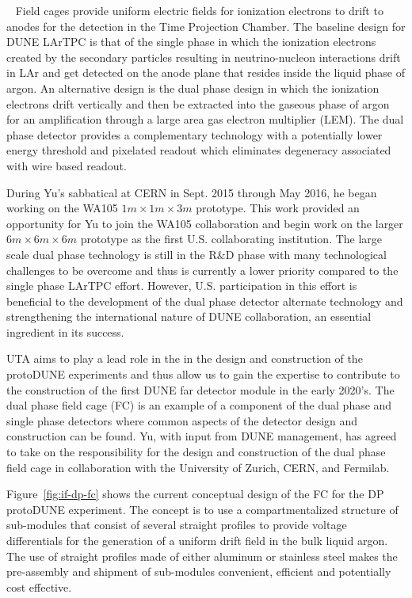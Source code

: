 ~\label{sec:proto-dune-dp-fc}
Field cages provide uniform electric fields for ionization electrons to drift to anodes for the detection in the Time Projection Chamber. The baseline design for DUNE LArTPC is that of the single phase in which the ionization electrons created by the secondary particles resulting in neutrino-nucleon interactions drift in LAr and get detected on the anode plane that resides inside the liquid phase of argon. An alternative design is the dual phase design in which the ionization electrons drift vertically and then be extracted into the gaseous phase of argon for an amplification through a large area gas electron multiplier (LEM). The dual phase detector provides a complementary technology with a potentially lower energy threshold and pixelated readout which eliminates degeneracy associated with wire based readout.

During Yu's sabbatical at CERN in Sept. 2015 through May 2016, he began working on the WA105 $1m\times 1m\times 3m$ prototype. This work provided an opportunity for Yu to join the WA105 collaboration and begin work on the larger $6m\times 6m\times 6m$ prototype as the first U.S. collaborating institution. The large scale dual phase technology is still in the R$\&$D phase with many technological challenges to be overcome and thus is currently a lower priority compared to the single phase LArTPC effort. However, U.S. participation in this effort is beneficial to the development of the dual phase detector alternate technology and strengthening the international nature of DUNE collaboration, an essential ingredient in its success.

UTA aims to play a lead role in the in the design and construction of the protoDUNE experiments and thus allow us to gain the expertise to contribute to the construction of the first DUNE far detector module in the early 2020's. The dual phase field cage (FC) is an example of a component of the dual phase and single phase detectors where common aspects of the detector design and construction can be found. Yu, with input from DUNE management, has agreed to take on the responsibility for the design and construction of the dual phase field cage in collaboration with the University of Zurich, CERN, and Fermilab.


Figure~\ref{fig:if-dp-fc} shows the current conceptual design of the FC for the DP protoDUNE experiment.  The concept is to use a compartmentalized structure of sub-modules that consist of several straight profiles to provide voltage differentials for the generation of a uniform drift field in the bulk liquid argon. The use of straight profiles made of either aluminum or stainless steel makes the pre-assembly and shipment of sub-modules convenient, efficient and potentially cost effective. 

